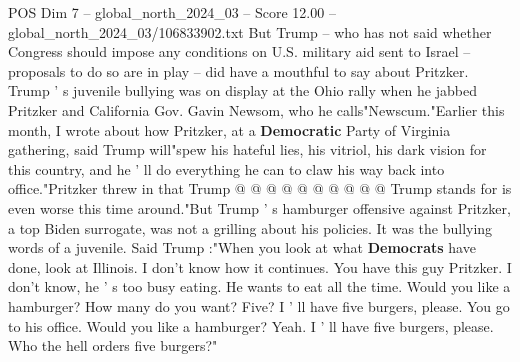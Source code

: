 \begin{textsample}{POS Dim 7 – global\_north\_2024\_03 – Score 12.00 – global\_north\_2024\_03/106833902.txt}
But Trump -- who has not said whether Congress should impose any conditions on U.S. military aid sent to Israel -- proposals to do so are in play -- did have a mouthful to say about Pritzker.
Trump ' s juvenile bullying was on display at the Ohio rally when he jabbed Pritzker and California Gov.
Gavin Newsom, who he calls"Newscum."Earlier this month, I wrote about how Pritzker, at a \textbf{Democratic} Party of Virginia gathering, said Trump will"spew his hateful lies, his vitriol, his dark vision for this country, and he ' ll do everything he can to claw his way back into office."Pritzker threw in that Trump @ @ @ @ @ @ @ @ @ @ Trump stands for is even worse this time around."But Trump ' s hamburger offensive against Pritzker, a top Biden surrogate, was not a grilling about his policies.
It was the bullying words of a juvenile.
Said Trump :"When you look at what \textbf{Democrats} have done, look at Illinois.
I don't know how it continues.
You have this guy Pritzker.
I don't know, he ' s too busy eating.
He wants to eat all the time.
Would you like a hamburger?
How many do you want?
Five?
I ' ll have five burgers, please.
You go to his office.
Would you like a hamburger?
Yeah.
I ' ll have five burgers, please.
Who the hell orders five burgers?"

\end{textsample}
